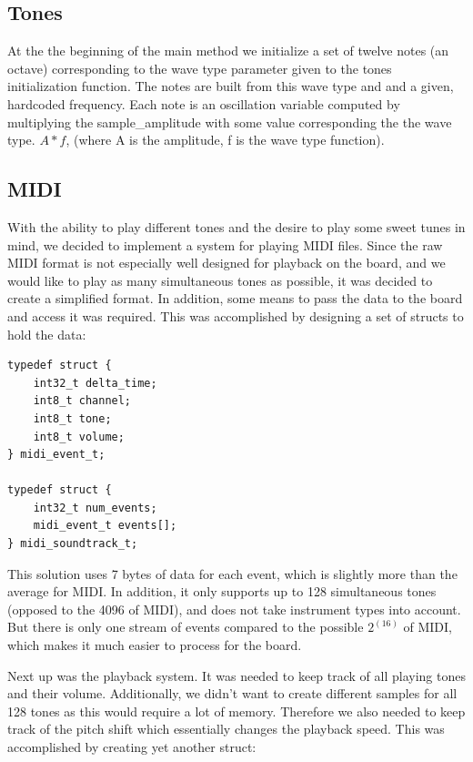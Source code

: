 \documentclass[a4paper,12pt]{article}
\begin{document}
\subsection{Tones}
At the the beginning of the main method we initialize a set of twelve notes (an octave) corresponding to the wave type parameter given to the tones initialization function. The notes are built from this wave type and and a given, hardcoded frequency. Each note is an oscillation variable computed by multiplying the sample\_amplitude with some value corresponding the the wave type. $A * f$, (where A is the amplitude, f is the wave type function).

\subsection{MIDI}
With the ability to play different tones and the desire to play some sweet tunes in mind, we decided to implement a system for playing MIDI files. Since the raw MIDI format is not especially well designed for playback on the board, and we would like to play as many simultaneous tones as possible, it was decided to create a simplified format. In addition, some means to pass the data to the board and access it was required. This was accomplished by designing a set of structs to hold the data:

\begin{verbatim}
typedef struct {
    int32_t delta_time;
    int8_t channel;
    int8_t tone;
    int8_t volume;
} midi_event_t;

typedef struct {
    int32_t num_events;
    midi_event_t events[];
} midi_soundtrack_t;
\end{verbatim}

This solution uses 7 bytes of data for each event, which is slightly more than the average for MIDI. In addition, it only supports up to 128 simultaneous tones (opposed to the 4096 of MIDI), and does not take instrument types into account. But there is only one stream of events compared to the possible $2^(16)$ of MIDI, which makes it much easier to process for the board.

Next up was the playback system. It was needed to keep track of all playing tones and their volume. Additionally, we didn’t want to create different samples for all 128 tones as this would require a lot of memory. Therefore we also needed to keep track of the pitch shift which essentially changes the playback speed. This was accomplished by creating yet another struct:
\end{document}
